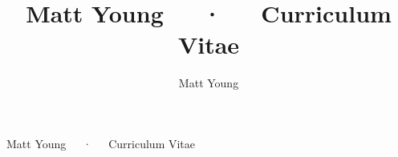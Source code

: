 \documentclass[11pt, a4paper]{cv}
\author{Matt Young}
\title{Matt Young~~~·~~~Curriculum Vitae}
\begin{document}
\faCode
\faSecret
\faVersionControl
\faBoldCode
\faProfessional
\faEnvelope
\faEnvelopeFilled
\faMugFilled

\faTerminal
\faTerminalFilled
\faCurlyBraces
\faCurlyBracesBold
\faMug
\faPhone

\faJavascript
\faSass
\faNodejs
\faReact
\faAngular
\faDocker
\faJenkins
\faGitVC
\faGitHub
\faLinkedIn
\faJenkinsCI



\makecvfooter{\today}
{Matt Young~~~·~~~Curriculum Vitae}
{\thepage}





\newpage




\end{document}
